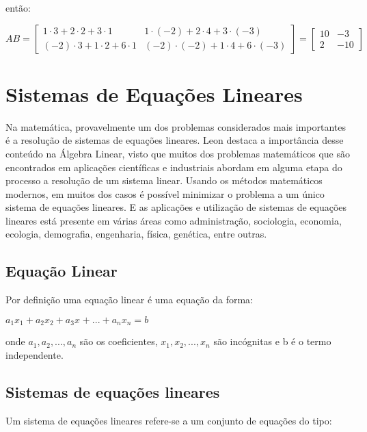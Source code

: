 então:

\begin{center}
    $AB =
    \begin{bmatrix}
        1 \cdot 3 + 2 \cdot 2 + 3 \cdot 1 & 1 \cdot (-2) + 2 \cdot 4 + 3 \cdot (-3) \\ 
        (-2) \cdot 3 + 1 \cdot 2 + 6 \cdot 1 & (-2) \cdot (-2) + 1 \cdot 4 + 6 \cdot (-3)
    \end{bmatrix}
    =
    \begin{bmatrix}
        10 & -3 \\ 
        2 & -10 
    \end{bmatrix}$
\end{center}

\section{Sistemas de Equações Lineares}
\noindent Na matemática, provavelmente um dos problemas considerados mais importantes é a resolução de sistemas de equações lineares. Leon \cite{1998:Leon} destaca a importância desse conteúdo na Álgebra Linear, visto que muitos dos problemas matemáticos que são encontrados em aplicações científicas e industriais abordam em alguma etapa do processo a resolução de um sistema linear. Usando os métodos matemáticos modernos, em muitos dos casos é possível minimizar o problema a um único sistema de equações lineares. E as aplicações e utilização de sistemas de equações lineares está presente em várias áreas como administração, sociologia, economia, ecologia, demografia, engenharia, física, genética, entre outras.

\subsection{Equação Linear}
\noindent Por definição uma equação linear é uma equação da forma: 
\begin{center}
    $a_{1}x_{1} + a_{2}x_{2} + a_{3}x_{} + ... + a_{n}x_{n} = b$   
\end{center}
onde $a_{1}, a_{2}, ..., a_{n}$ são os coeficientes, $x_{1}, x_{2}, ..., x_{n}$ são incógnitas e b é o termo independente.

\subsection{Sistemas de equações lineares}
\noindent Um sistema de equações lineares refere-se a um conjunto de equações do tipo:\\

